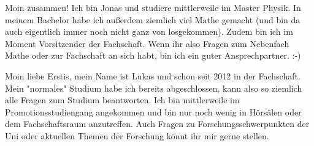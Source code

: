 \begin{multicols}{2}
\vspace{-0.8cm}

{
Moin zusammen! Ich bin Jonas und studiere mittlerweile im Master Physik. In meinem Bachelor habe ich außerdem ziemlich viel Mathe gemacht (und bin da auch eigentlich immer noch nicht ganz von losgekommen). 
Zudem bin ich im Moment Vorsitzender der Fachschaft. Wenn ihr also Fragen zum Nebenfach Mathe oder zur Fachschaft an sich habt, bin ich ein guter Ansprechpartner. :-)
}

{
Moin liebe Erstis, mein Name ist Lukas und schon seit 2012 in der Fachschaft. Mein "normales" Studium habe ich bereits abgeschlossen, kann also so ziemlich alle Fragen zum Studium beantworten.
Ich bin mittlerweile im Promotionsstudiengang angekommen und bin nur noch wenig in Hörsälen oder dem Fachschaftsraum anzutreffen.
Auch Fragen zu Forschungsschwerpunkten der Uni oder aktuellen Themen der Forschung könnt ihr mir gerne stellen.
}


\end{multicols}

